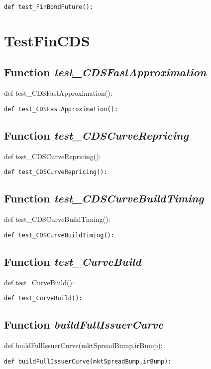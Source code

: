 \documentclass[twoside,11pt]{book}
\begin{document}
\begin{lstlisting}
def test_FinBondFuture():
\end{lstlisting}


\newpage
\section{TestFinCDS}

\subsection{Function {\it test\_CDSFastApproximation}}
def test\_CDSFastApproximation():

\begin{lstlisting}
def test_CDSFastApproximation():
\end{lstlisting}

\subsection{Function {\it test\_CDSCurveRepricing}}
def test\_CDSCurveRepricing():

\begin{lstlisting}
def test_CDSCurveRepricing():
\end{lstlisting}

\subsection{Function {\it test\_CDSCurveBuildTiming}}
def test\_CDSCurveBuildTiming():

\begin{lstlisting}
def test_CDSCurveBuildTiming():
\end{lstlisting}

\subsection{Function {\it test\_CurveBuild}}
def test\_CurveBuild():

\begin{lstlisting}
def test_CurveBuild():
\end{lstlisting}

\subsection{Function {\it buildFullIssuerCurve}}
def buildFullIssuerCurve(mktSpreadBump,irBump):

\begin{lstlisting}
def buildFullIssuerCurve(mktSpreadBump,irBump):
\end{lstlisting}
\end{document}

